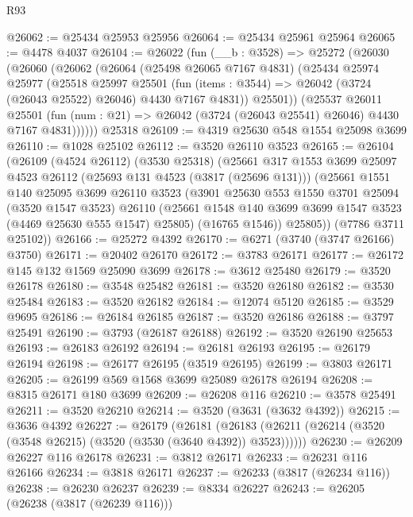 \begin{lexlean}{R93}
\begin{coremodule}
@26062 := @25434 @25953 @25956
@26064 := @25434 @25961 @25964
@26065 := @4478 @4037
@26104 := @26022
    (fun (__b : @3528) =>
    @25272
      (@26030
        (@26060
          (@26062
            (@26064
              (@25498 @26065 @7167 @4831)
              (@25434
                @25974
                @25977
                (@25518
                  @25997
                  @25501
                  (fun (items : @3544) => @26042 (@3724 (@26043 @25522) @26046) @4430 @7167 @4831))
                @25501))
            (@25537
              @26011
              @25501
              (fun (num : @21) => @26042 (@3724 (@26043 @25541) @26046) @4430 @7167 @4831))))))
    @25318
@26109 := @4319 @25630 @548 @1554 @25098 @3699
@26110 := @1028 @25102
@26112 := @3520 @26110 @3523
@26165 := @26104
    (@26109
      (@4524 @26112)
      (@3530 @25318)
      (@25661
        @317
        @1553
        @3699
        @25097
        @4523
        @26112
        (@25693 @131 @4523 (@3817 (@25696 @131)))
        (@25661
          @1551
          @140
          @25095
          @3699
          @26110
          @3523
          (@3901
            @25630
            @553
            @1550
            @3701
            @25094
            (@3520 @1547 @3523)
            @26110
            (@25661 @1548 @140 @3699 @3699 @1547 @3523 (@4469 @25630 @555 @1547) @25805)
            (@16765 @1546))
          @25805))
      (@7786 @3711 @25102))
@26166 := @25272 @4392
@26170 := @6271 (@3740 (@3747 @26166) @3750)
@26171 := @20402 @26170
@26172 := @3783 @26171
@26177 := @26172 @145 @132 @1569 @25090 @3699
@26178 := @3612 @25480
@26179 := @3520 @26178
@26180 := @3548 @25482
@26181 := @3520 @26180
@26182 := @3530 @25484
@26183 := @3520 @26182
@26184 := @12074 @5120
@26185 := @3529 @9695
@26186 := @26184 @26185
@26187 := @3520 @26186
@26188 := @3797 @25491
@26190 := @3793 (@26187 @26188)
@26192 := @3520 @26190 @25653
@26193 := @26183 @26192
@26194 := @26181 @26193
@26195 := @26179 @26194
@26198 := @26177 @26195 (@3519 @26195)
@26199 := @3803 @26171
@26205 := @26199 @569 @1568 @3699 @25089 @26178 @26194
@26208 := @8315 @26171 @180 @3699
@26209 := @26208 @116
@26210 := @3578 @25491
@26211 := @3520 @26210
@26214 := @3520 (@3631 (@3632 @4392))
@26215 := @3636 @4392
@26227 := @26179
    (@26181 (@26183 (@26211 (@26214 (@3520 (@3548 @26215) (@3520 (@3530 (@3640 @4392)) @3523))))))
@26230 := @26209 @26227 @116 @26178
@26231 := @3812 @26171
@26233 := @26231 @116 @26166
@26234 := @3818 @26171
@26237 := @26233 (@3817 (@26234 @116))
@26238 := @26230 @26237
@26239 := @8334 @26227
@26243 := @26205 (@26238 (@3817 (@26239 @116)))

\end{coremodule}
\end{lexlean}
